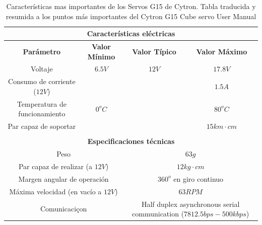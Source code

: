    \begin{table}[H]
    	\caption{Características mas importantes de los Servos G15 de Cytron. Tabla traducida y resumida a los puntos más importantes del Cytron G15 Cube servo User Manual \cite{CytronTechnologies2012} }
    	\label{tab:g15_catact}
    	\begin{center}
    		\begin{minipage}{\textwidth}
    			\begin{tabular}{ |c|c|c|c| }
    				\hline
    				\multicolumn{4}{|c|}{\textbf{Características eléctricas}} \\ 
    				\hline
    				\textbf{Parámetro} & \textbf{Valor Mínimo} & \textbf{Valor Típico} & \textbf{Valor Máximo} \\
    				\hline
					Voltaje & $6.5V$ & $12V$ & $17.8V$ \\
    				\hline
    				Consumo de corriente ($12V$) & & & $1.5A$ \\
    				\hline
    				Temperatura de funcionamiento & $0^oC$ & & $80^oC$ \\
    				\hline
    				Par capaz de soportar & & & $15km \cdot cm$ \\
    				\hline
    				\multicolumn{4}{c}{\textbf{}} \\ 
    				\hline
    				\multicolumn{4}{|c|}{\textbf{Especificaciones técnicas}} \\ 
    				\hline
    				\multicolumn{2}{|c|}{Peso} & \multicolumn{2}{|c|}{$63g$}\\ 
    				\hline
    				\multicolumn{2}{|c|}{Par capaz de realizar (a $12V$)} & \multicolumn{2}{|c|}{$12kg \cdot cm$}\\ 
    				\hline
    				\multicolumn{2}{|c|}{Margen angular de operación } & \multicolumn{2}{|c|}{$360^o$ en giro continuo}\\ 
    				\hline
    				\multicolumn{2}{|c|}{Máxima velocidad (en vacío a $12V$)} & \multicolumn{2}{|c|}{$63 RPM$ }\\ 
    				\hline    			
    				\multicolumn{2}{|c|}{Comunicaciçon} & \multicolumn{2}{|c|}{Half duplex asynchronous serial communication ($7812.5bps-500kbps $)}\\ 
    				\hline    				 	 
    			\end{tabular}
    		\end{minipage}
    	\end{center}
    \end{table}
    

